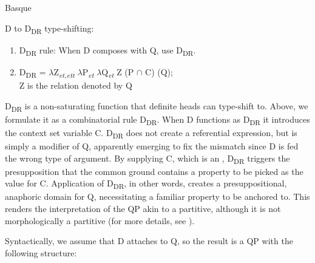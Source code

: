 \documentclass[output=paper,
modfonts
]{langscibook}
\begin{document}
\ea\label{ex:etxeberria:17} 
Basque \citep{etxeberria2005}
\z
\z

\ea\label{ex:etxeberria:18}
	D to D\textsubscript{DR} type-shifting:
	\begin{enumerate}
		\item D\textsubscript{DR} rule: When D composes with Q, use D\textsubscript{DR}.
		\item D\textsubscript{DR} = $\lambda$Z\textsubscript{\textit{et,ett}} $\lambda$P\textsubscript{\textit{et}} $\lambda$Q\textsubscript{\textit{et}} Z (P $\cap$ C) (Q);\\ Z is the relation denoted by Q
	\end{enumerate}
\z

D\textsubscript{DR} is a non-saturating function that definite heads can type-shift to. Above, we formulate it as a combinatorial rule D\textsubscript{DR}. When D functions as D\textsubscript{DR} it introduces the context set variable C. D\textsubscript{DR} does not create a referential expression, but is simply a modifier of Q, apparently emerging to fix the mismatch since D is fed the wrong type of argument. By supplying C, which is an , D\textsubscript{DR} triggers the presupposition that the common ground contains a property to be picked as the value for C. Application of D\textsubscript{DR}, in other words, creates a presuppositional, anaphoric domain for Q, necessitating a  familiar property to be anchored to. This renders the interpretation of the QP akin to a partitive, although it is not morphologically a partitive (for more details, see \citealt{etxeberria-giannakidou2009, etxeberria-giannakidou2014}). 

Syntactically, we assume that D attaches to Q, so the result is a QP with the following structure:
\end{document}
